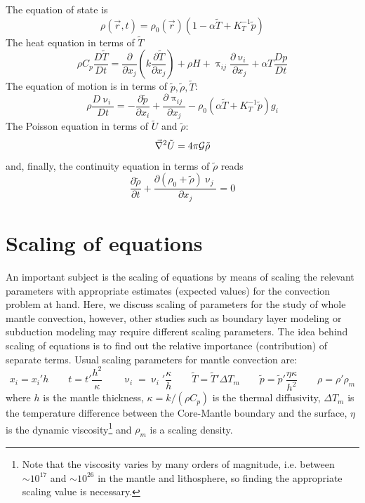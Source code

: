 The equation of state is
\begin{equation}
\rho(\vec{r},t) = \rho_0(\vec{r}) \left(1-\alpha \tilde{T} + K_T^{-1} \tilde{p}  \right) 
\label{eq:md71a}
\end{equation}
The heat equation in terms of $\tilde{T}$
\begin{equation}
\rho C_p \frac{D \tilde{T} }{Dt} = \frac{\partial }{\partial x_j} 
\left( k \frac{\partial \tilde{T} }{\partial x_j}  \right)
+ \rho H + \uppi_{ij}\frac{\partial \upnu_i}{\partial x_j} + \alpha T \frac{Dp}{Dt}
\label{eq:md71b}
\end{equation}
The equation of motion is in terms of $\tilde{p},\tilde{\rho},\tilde{T}$:
\begin{equation}
\rho \frac{D \upnu_i}{Dt} = -\frac{\partial \tilde{p} }{\partial x_i}
+\frac{\partial \uppi_{ij}}{\partial x_j}
-\rho_0 (\alpha \tilde{T} + K_T^{-1} \tilde{p} ) g_i
\label{eq:md71c}
\end{equation}
The Poisson equation in terms of $\tilde{U}$ and $\tilde{\rho}$:
\begin{equation}
\vec\nabla^2 \tilde{U} = 4 \pi {\cal G} \tilde{\rho} 
\label{eq:md71d}
\end{equation}
and, finally, the continuity equation in terms of $\tilde{\rho}$ reads
\begin{equation}
\frac{\partial \tilde{\rho} }{\partial t} + 
\frac{\partial (\rho_0 + \tilde{\rho} ) \upnu_j }{\partial x_j} =0
\label{eq:md71e}
\end{equation}


\section{Scaling of equations}


An important subject is the scaling of equations by means of scaling the relevant
parameters with appropriate estimates (expected values) for the convection problem at
hand. Here, we discuss scaling of parameters for the study of whole mantle convection,
however, other studies such as boundary layer modeling or subduction modeling may
require different scaling parameters. The idea behind scaling of equations is to find out
the relative importance (contribution) of separate terms. Usual scaling parameters for
mantle convection are:
\[
x_i = x_i' h
\qquad
t = t' \frac{h^2}{\kappa}
\qquad
\upnu_i = \upnu_i' \frac{\kappa}{h} 
\qquad
{\tilde T} = {\tilde T}' \Delta T_m
\qquad
{\tilde p} = {\tilde p}' \frac{\eta \kappa}{h^2}
\qquad
\rho = \rho' \rho_m 
\]
where $h$ is the mantle thickness, $\kappa=k/(\rho C_p)$
is the thermal diffusivity, $\Delta T_m$ is the
temperature difference between the Core-Mantle boundary and the surface,
$\eta$ is the dynamic viscosity\footnote{Note that the viscosity varies by 
many orders of magnitude, i.e. between $\sim 10^{17}$ and $\sim 10^{26}$ 
in the mantle and lithosphere, so finding the appropriate scaling 
value is necessary.} and $\rho_m$ is a scaling density.


